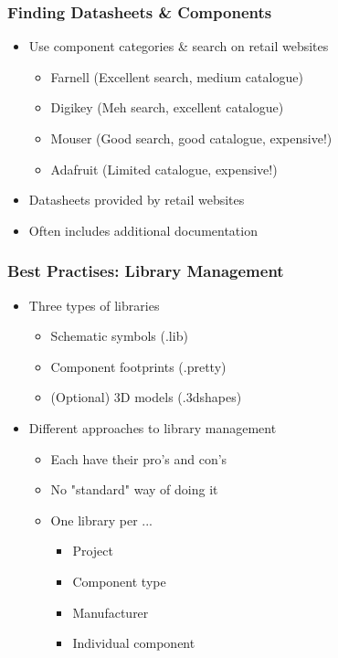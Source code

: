\documentclass{beamer}
\begin{document}
\begin{frame}
  \frametitle{Finding Datasheets \& Components}
  \begin{itemize}
    \item Use component categories \& search on retail websites
    \begin{itemize}
      \item Farnell (Excellent search, medium catalogue)
      \item Digikey (Meh search, excellent catalogue)
      \item Mouser (Good search, good catalogue, expensive!)
      \item Adafruit (Limited catalogue, expensive!)
    \end{itemize}
    \item Datasheets provided by retail websites
    \item Often includes additional documentation
  \end{itemize}
\end{frame}



\begin{frame}
  \frametitle{Best Practises: Library Management}
  \begin{itemize}
    \item Three types of libraries
    \begin{itemize}
      \item Schematic symbols (.lib)
      \item Component footprints (.pretty)
      \item (Optional) 3D models (.3dshapes)
    \end{itemize}
    \item Different approaches to library management
    \begin{itemize}
      \item Each have their pro's and con's
      \item No "standard" way of doing it
      \item One library per ...
      \begin{itemize}
        \item Project
        \item Component type
        \item Manufacturer
        \item Individual component
      \end{itemize}
    \end{itemize}
  \end{itemize}
\end{frame}
\end{document}

